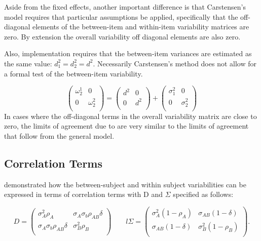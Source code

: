 \documentclass[12pt, a4paper]{report}
\theoremstyle{plain}
\theoremstyle{definition}
\theoremstyle{remark}
\begin{document}


Aside from the fixed effects, another important difference is that Carstensen's model requires that particular assumptions be applied, specifically that the off-diagonal elements of the between-item
and within-item variability matrices are zero. By extension the
overall variability off diagonal elements are also zero.




Also, implementation requires that the between-item variances are
estimated as the same value: $d^2_1 = d^2_2 = d^2$. Necessarily
Carstensen's method does not allow for a formal test of the
between-item variability.

\[\left(\begin{array}{cc}
\omega^1_2  & 0 \\
0 & \omega^2_2 \\
\end{array}  \right)
=  \left(
\begin{array}{cc}
d^2  & 0 \\
0 & d^2 \\
\end{array} \right)+
\left(
\begin{array}{cc}
\sigma^2_1  & 0 \\
0 & \sigma^2_2 \\
\end{array}\right)
\]
In cases where the off-diagonal terms in the overall variability
matrix are close to zero, the limits of agreement due to \citet{BXC2008} are very similar to the limits of agreement that follow from the general model.











		\subsection{Correlation Terms}
		
		\citet{hamlett} demonstrated how the between-subject and within subject variabilities can be expressed in terms of
		correlation terms with D and $\Sigma$ specified as follows:
		
		\[
		{D} = \left( \begin{array}{cc}
		\sigma^2_{A}\rho_{A} & \sigma_{A}\sigma_{b}\rho_{AB}\delta \\
		\sigma_{A}\sigma_{b}\rho_{AB}\delta & \sigma^2_{B}\rho_{B}\\
		
		\end{array}\right)
		\qquad
		l{\Sigma} = \left(
		\begin{array}{cc}
		\sigma^2_{A}(1-\rho_{A}) & \sigma_{AB}(1-\delta)  \\
		\sigma_{AB}(1-\delta) & \sigma^2_{B}(1-\rho_{B}) \\
		\end{array}\right).
		\]
		
\end{document}
